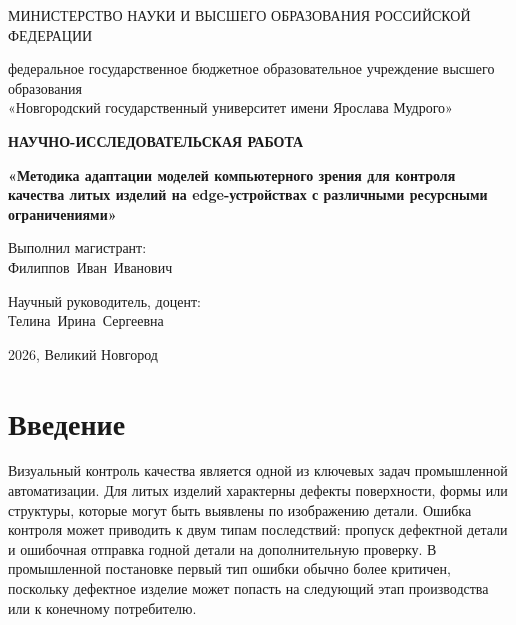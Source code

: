 \documentclass[12pt,a4paper]{article}
\begin{document}
\begin{titlepage}
\thispagestyle{empty}
\begin{center}
МИНИСТЕРСТВО НАУКИ И ВЫСШЕГО ОБРАЗОВАНИЯ РОССИЙСКОЙ ФЕДЕРАЦИИ

\vspace{0.8cm}
федеральное государственное бюджетное образовательное учреждение высшего образования\\
«Новгородский государственный университет имени Ярослава Мудрого»

\vspace{3.5cm}
{\bfseries НАУЧНО-ИССЛЕДОВАТЕЛЬСКАЯ РАБОТА}

\vspace{1.2cm}
{\bfseries «Методика адаптации моделей компьютерного зрения для контроля качества литых изделий на edge-устройствах с различными ресурсными ограничениями»}
\end{center}

\vspace{3cm}
\begin{flushright}
Выполнил магистрант:\\
\mbox{Филиппов Иван Иванович}

\vspace{0.8cm}
Научный руководитель, доцент:\\
\mbox{Телина Ирина Сергеевна}
\end{flushright}

\vfill
\begin{center}
2026, Великий Новгород
\end{center}
\end{titlepage}

\tableofcontents
\newpage

\section*{Введение}

Визуальный контроль качества является одной из ключевых задач промышленной автоматизации. Для литых изделий характерны дефекты поверхности, формы или структуры, которые могут быть выявлены по изображению детали. Ошибка контроля может приводить к двум типам последствий: пропуск дефектной детали и ошибочная отправка годной детали на дополнительную проверку. В промышленной постановке первый тип ошибки обычно более критичен, поскольку дефектное изделие может попасть на следующий этап производства или к конечному потребителю.
\end{document}
